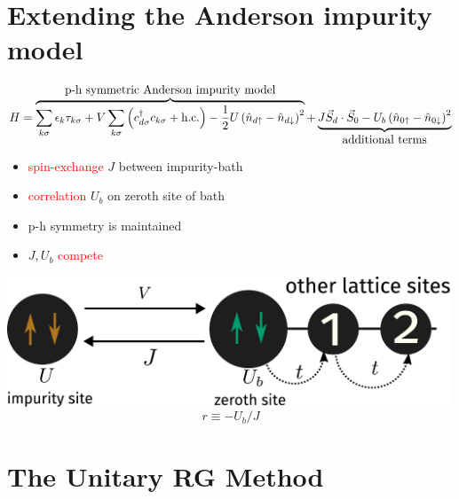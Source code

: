 \documentclass[11pt,aspectratio=169]{beamer}
\newcommand{\focus}[1]{\textcolor{red}{#1}}
\begin{document}
\section{Extending the Anderson impurity model}
\label{the-model}
\begin{frame}{\insertsectionhead}

\[H = \overbrace{\sum_{k\sigma}\epsilon_k \tau_{k\sigma} + V \sum_{k\sigma}\left(c^\dagger_{d\sigma}c_{k\sigma} + \text{h.c.}\right)  - \frac{1}{2}U \left(\hat n_{d \uparrow} - \hat n_{d \downarrow}\right)^2}^\text{\normalsize p-h symmetric Anderson impurity model} + \underbrace{J \vec{S}_d\cdot\vec{S}_0 - U_b \left(\hat n_{0 \uparrow} - \hat n_{0 \downarrow}\right)^2}_\text{\normalsize additional terms}\]

\vspace*{\fill}

\hspace*{-30pt}
\begin{minipage}{0.55\textwidth}
\begin{itemize}
	\item \focus{spin-exchange} \(J\) between impurity-bath\\[10pt]
	\item \focus{correlation} \(U_b\) on zeroth site of bath\\[10pt]
	\item p-h symmetry is maintained\\[10pt]
	\item \(J,U_b\) \focus{compete} 
\end{itemize}
\end{minipage}
\begin{minipage}{0.5\textwidth}
\includegraphics[width=0.99\textwidth]{figures/zeromode_bare.pdf}
\[ r \equiv -U_b/J \]
\end{minipage}

\vspace*{\fill}

\end{frame}

\section{The Unitary RG Method}
\label{method}
\end{document}
